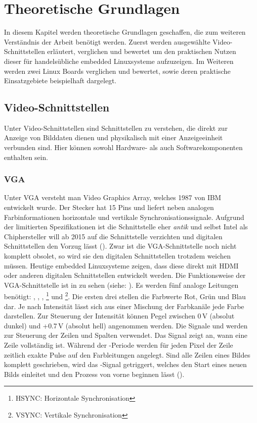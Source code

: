 \chapter{Theoretische Grundlagen}
\label{cha:Grundlagen}
In diesem Kapitel werden theoretische Grundlagen geschaffen, die zum weiteren Verständnis der Arbeit benötigt werden. Zuerst werden ausgewählte Video-Schnittstellen erläutert, verglichen und bewertet um den praktischen Nutzen dieser für handelsübliche embedded Linuxsysteme aufzuzeigen. Im Weiteren werden zwei Linux Boards verglichen und bewertet, sowie deren praktische Einsatzgebiete beispielhaft dargelegt.

\section{Video-Schnittstellen}
Unter Video-Schnittstellen sind Schnittstellen zu verstehen, die direkt zur Anzeige von Bilddaten dienen und physikalisch mit einer Anzeigeeinheit verbunden sind. Hier können sowohl Hardware- als auch Softwarekomponenten enthalten sein.
\subsection{VGA}
Unter VGA versteht man Video Graphics Array, welches 1987 von IBM entwickelt wurde. Der Stecker hat 15 Pins und liefert neben analogen Farbinformationen horizontale und vertikale Synchronisationssignale. Aufgrund der limitierten Spezifikationen ist die Schnittstelle eher \textit{antik} und selbst Intel als Chiphersteller will ab 2015 auf die Schnittstelle verzichten und digitalen Schnittstellen den Vorzug lässt (\cite{Intel2010}). Zwar ist die VGA-Schnittstelle noch nicht komplett obsolet, so wird sie den digitalen Schnittstellen trotzdem weichen müssen. Heutige embedded Linuxsysteme zeigen, dass diese direkt mit HDMI oder anderen digitalen Schnittstellen entwickelt werden.
Die Funktionsweise der VGA-Schnittstelle ist in  zu sehen (siehe: \cite{Valcarce2011}). Es werden fünf analoge Leitungen benötigt: , , , \footnote{HSYNC: Horizontale Synchronisation} und \footnote{VSYNC: Vertikale Synchronisation}. Die ersten drei stellen die Farbwerte Rot, Grün und Blau dar. Je nach Intensität lässt sich aus einer Mischung der Farbkanäle jede Farbe darstellen. Zur Steuerung der Intensität können Pegel zwischen 0\,V (absolut dunkel) und +0.7\,V (absolut hell) angenommen werden. Die Signale  und  werden zur Steuerung der Zeilen und Spalten verwendet. Das Signal  zeigt an, wann eine Zeile vollständig ist. Während der -Periode werden für jeden Pixel der Zeile zeitlich exakte Pulse auf den Farbleitungen angelegt. Sind alle Zeilen eines Bildes komplett geschrieben, wird das -Signal getriggert, welches den Start eines neuen Bilds einleitet und den Prozess von vorne beginnen lässt (\cite{Valcarce2011}).

